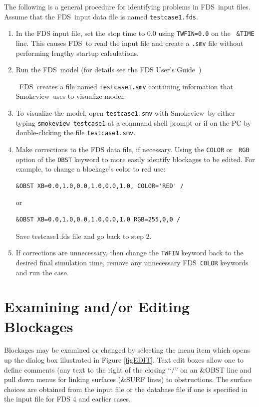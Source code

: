 \documentclass[11pt,twoside]{book}
\newcommand{\FDS}{{FDS}}
\newcommand{\fds}{{FDS}}
\newcommand{\smokeview}{{Smokeview}}
\newcommand{\frameit}[1]{\fbox{\tt #1}}
\begin{document}
The following is a general procedure for identifying problems in
\fds\ input files. Assume that the \fds\ input data file is named
{\tt testcase1.fds}.
\begin{enumerate}
\item In the FDS input file, set the stop time to $0.0$ using {\tt TWFIN=0.0} on the {\tt
\&TIME} line. This causes \fds\ to read the input file and create
a {\tt .smv} file without  performing lengthy startup
calculations.

\item Run the \fds\ model
(for details see the FDS User's Guide~\cite{FDS_Users_Guide_5})

\noindent\ \FDS\ creates a file named {\tt testcase1.smv}
containing information that \smokeview\ uses to visualize model.

\item To visualize the model, open {\tt testcase1.smv} with
\smokeview\ by either typing {\tt smokeview testcase1} at a
command shell prompt or if on the PC by double-clicking the file
{\tt testcase1.smv}.

\item Make corrections to the FDS data file, if necessary. Using the {\tt COLOR} or {\tt
RGB} option of the
{\tt OBST} keyword to more easily identify blockages to be edited.
For example, to change a blockage's color to red use:
\begin{verbatim}
&OBST XB=0.0,1.0,0.0,1.0,0.0,1.0, COLOR='RED' /
\end{verbatim}
\noindent or
\begin{verbatim}
&OBST XB=0.0,1.0,0.0,1.0,0.0,1.0 RGB=255,0,0 /
\end{verbatim}

\noindent Save testcase1.fds file and go back to step 2.

\item If corrections are unnecessary, then change the {\tt TWFIN}
keyword back to the desired final simulation time, remove any
unnecessary \fds\ {\tt COLOR} keywords and run the case.
\end{enumerate}

\section{Examining and/or Editing Blockages}  Blockages may be examined or changed by selecting
the menu item \frameit{Dialogs/Edit Geometry} which opens up the dialog box
illustrated in Figure \ref{figEDIT}. Text edit boxes allow one to
define comments (any text to the right of the closing ``/'' on an
\&OBST line and pull down menus for linking surfaces (\&SURF
lines) to obstructions. The surface choices are obtained from the
input file or the database file if one is specified in the input
file for FDS 4 and earlier cases.
\end{document}
